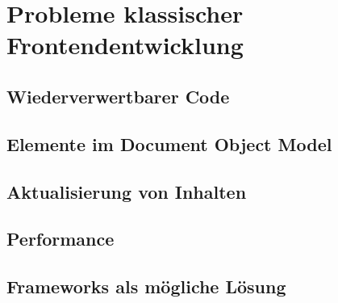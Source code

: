 \newpage
\section{Probleme klassischer Frontendentwicklung}
\subsection{Wiederverwertbarer Code}
\subsection{Elemente im Document Object Model}
\subsection{Aktualisierung von Inhalten}
\subsection{Performance}
\subsection{Frameworks als mögliche Lösung}